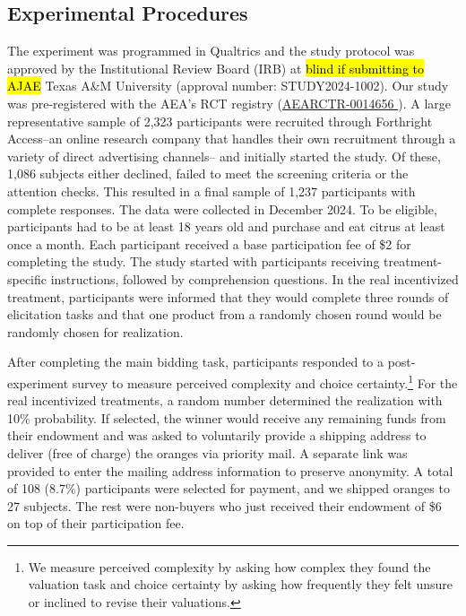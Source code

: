 \documentclass[12pt]{article}
\begin{document}
\subsection{Experimental Procedures}
The experiment was programmed in Qualtrics and the study protocol was approved by the Institutional Review Board (IRB) at \hl{blind if submitting to AJAE} Texas A\&M University (approval number: STUDY2024-1002). Our study was pre-registered with the AEA's RCT registry (\href{https://www.socialscienceregistry.org/trials/14656}{AEARCTR-0014656
}). A large representative sample of 2,323 participants were recruited through Forthright Access--an online research company that handles their own recruitment through a variety of direct advertising channels-- and initially started the study. Of these, 1,086 subjects either declined, failed to meet the screening criteria or the attention checks. This resulted in a final sample of 1,237 participants with complete responses. The data were collected in December 2024. To be eligible, participants had to be at least 18 years old and purchase and eat citrus at least once a month. 
Each participant received a base participation fee of \$2 for completing the study. The study started with participants receiving treatment-specific instructions, followed by comprehension questions. In the real incentivized treatment, participants were informed that they would complete three rounds of elicitation tasks and that one product from a randomly chosen round would be randomly chosen for realization. 

After completing the main bidding task, participants responded to a post-experiment survey to measure perceived complexity and choice certainty.\footnote{We measure perceived complexity by asking how complex they found the valuation task and choice certainty by asking how frequently they felt unsure or inclined to revise their valuations.} For the real incentivized treatments, a random number determined the realization with 10\% probability.  If selected, the winner would receive any remaining funds from their endowment and was asked to voluntarily provide a shipping address to deliver (free of charge) the oranges via priority mail. A separate link was provided to enter the mailing address information to preserve anonymity. A total of 108 (8.7\%) participants were selected for payment, and we shipped oranges to 27 subjects. The rest were non-buyers who just received their endowment of \$6 on top of their participation fee. 
\end{document}
